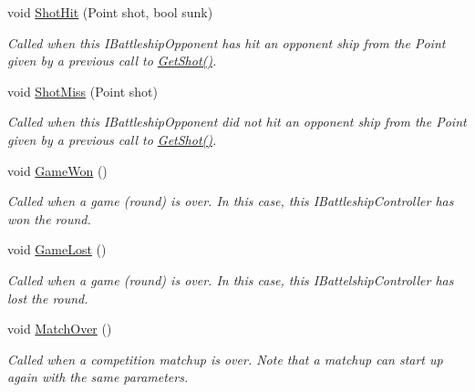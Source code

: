\begin{DoxyCompactItemize}
void \hyperlink{class_m_b_c_1_1_controllers_1_1_random_bot_a0bf8aa243be03ada21bb300e7238d0be}{Shot\-Hit} (Point shot, bool sunk)
\begin{DoxyCompactList}\small\item\em Called when this I\-Battleship\-Opponent has hit an opponent ship from the Point given by a previous call to \hyperlink{class_m_b_c_1_1_controllers_1_1_random_bot_a6913b193a39e760dbb0372f9f7f530db}{Get\-Shot()}.\end{DoxyCompactList}\item 
void \hyperlink{class_m_b_c_1_1_controllers_1_1_random_bot_ab3246f7e268ca4be0bef0ae3f9f990f8}{Shot\-Miss} (Point shot)
\begin{DoxyCompactList}\small\item\em Called when this I\-Battleship\-Opponent did not hit an opponent ship from the Point given by a previous call to \hyperlink{class_m_b_c_1_1_controllers_1_1_random_bot_a6913b193a39e760dbb0372f9f7f530db}{Get\-Shot()}.\end{DoxyCompactList}\item 
\hypertarget{class_m_b_c_1_1_controllers_1_1_random_bot_a61d68e93efa720166f1f43aa10d30679}{void \hyperlink{class_m_b_c_1_1_controllers_1_1_random_bot_a61d68e93efa720166f1f43aa10d30679}{Game\-Won} ()}\label{class_m_b_c_1_1_controllers_1_1_random_bot_a61d68e93efa720166f1f43aa10d30679}

\begin{DoxyCompactList}\small\item\em Called when a game (round) is over. In this case, this I\-Battleship\-Controller has won the round.\end{DoxyCompactList}\item 
\hypertarget{class_m_b_c_1_1_controllers_1_1_random_bot_adcf9ec0052ac4f20b102979a4ed0771b}{void \hyperlink{class_m_b_c_1_1_controllers_1_1_random_bot_adcf9ec0052ac4f20b102979a4ed0771b}{Game\-Lost} ()}\label{class_m_b_c_1_1_controllers_1_1_random_bot_adcf9ec0052ac4f20b102979a4ed0771b}

\begin{DoxyCompactList}\small\item\em Called when a game (round) is over. In this case, this I\-Battelship\-Controller has lost the round.\end{DoxyCompactList}\item 
\hypertarget{class_m_b_c_1_1_controllers_1_1_random_bot_a5e0fd0e964cb95bbc22067b3915b2b1e}{void \hyperlink{class_m_b_c_1_1_controllers_1_1_random_bot_a5e0fd0e964cb95bbc22067b3915b2b1e}{Match\-Over} ()}\label{class_m_b_c_1_1_controllers_1_1_random_bot_a5e0fd0e964cb95bbc22067b3915b2b1e}

\begin{DoxyCompactList}\small\item\em Called when a competition matchup is over. Note that a matchup can start up again with the same parameters.\end{DoxyCompactList}\end{DoxyCompactItemize}
